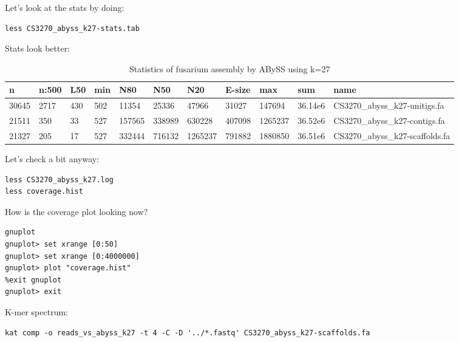 \begin{steps}
Let's look at the stats by doing:
\begin{lstlisting}
less CS3270_abyss_k27-stats.tab
\end{lstlisting}
\end{steps}

Stats look better:
\begin{table}[H]
\small
  \centering
  \caption{Statistics of fusarium assembly by ABySS using k=27}
    \begin{tabular}{lllllllllll}
    \toprule
    \textbf{n} & \textbf{n:500} & \textbf{L50} & \textbf{min} & \textbf{N80}& \textbf{N50}& \textbf{N20}& \textbf{E-size}& \textbf{max} & \textbf{sum}& \textbf{name}\\
    \midrule
    30645  & 2717   & 430  & 502  & 11354   & 25336   & 47966    & 31027   & 147694   & 36.14e6  & CS3270\_abyss\_k27-unitigs.fa \\
	21511  & 350    & 33   & 527  & 157565  & 338989  & 630228   & 407098  & 1265237  & 36.52e6  & CS3270\_abyss\_k27-contigs.fa \\
	21327  & 205    & 17   & 527  & 332444  & 716132  & 1265237  & 791882  & 1880850  & 36.51e6  & CS3270\_abyss\_k27-scaffolds.fa \\
    \bottomrule
    \end{tabular}
  \label{tab:fusariumk27}
\end{table}

\begin{steps}
Let's check a bit anyway:
\begin{lstlisting}
less CS3270_abyss_k27.log
less coverage.hist
\end{lstlisting}
\end{steps}

\begin{steps}
How is the coverage plot looking now?
\begin{lstlisting}
gnuplot
gnuplot> set xrange [0:50]
gnuplot> set xrange [0:4000000]
gnuplot> plot "coverage.hist"
%exit gnuplot
gnuplot> exit
\end{lstlisting}
\end{steps}

\begin{steps}
K-mer spectrum:
\begin{lstlisting}
kat comp -o reads_vs_abyss_k27 -t 4 -C -D '../*.fastq' CS3270_abyss_k27-scaffolds.fa
\end{lstlisting}
\end{steps}

